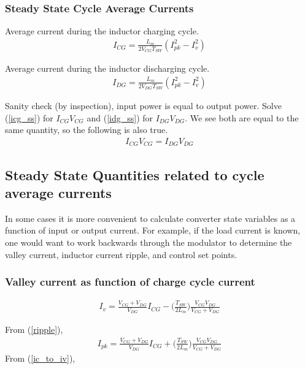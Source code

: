 \documentclass{scrartcl}
\begin{document}
		\subsubsection{Steady State Cycle Average Currents}
			Average current during the inductor charging cycle.
			\begin{align}
			I_{CG} = \frac{L_m}{2V_{CG}T_{SW}} (I_{pk}^2 - I_v^2) \label{icg_ss}
			\end{align}	
			
			Average current during the inductor discharging cycle.
			\begin{align}
			I_{DG} = \frac{L_m}{2V_{DG}T_{SW}} (I_{pk}^2 - I_v^2) \label{idg_ss}
			\end{align}	
			
			Sanity check (by inspection), input power is equal to output power. Solve (\ref{icg_ss}) for $I_{CG}V_{CG}$ and (\ref{idg_ss}) for $I_{DG}V_{DG}$.  We see both are equal to the same quantity, so the following is also true.
			\begin{align}
			I_{CG}V_{CG} = I_{DG}V_{DG}  
			\end{align}	
	
	\subsection{Steady State Quantities related to cycle average currents}	
	In some cases it is more convenient to calculate converter state variables as a function of input or output current.  For example, if the load current is known, one would want to work backwards through the modulator to determine the valley current, inductor current ripple, and control set points.
	
		\subsubsection{Valley current as function of charge cycle current}
			\begin{align}
			I_{v} = \frac{V_{CG} + V_{DG}}{V_{DG}} I_{CG} - \bigg(\frac{T_{SW}}{2L_m}\bigg)\frac{V_{CG}V_{DG}}{V_{CG} + V_{DG}} 
			\end{align}	
			
			From (\ref{ripple}),
			\begin{align}
			I_{pk} = \frac{V_{CG} + V_{DG}}{V_{DG}} I_{CG} + \bigg(\frac{T_{SW}}{2L_m}\bigg)\frac{V_{CG}V_{DG}}{V_{CG} + V_{DG}} 
			\end{align}	
			From (\ref{ic_to_iv}),
\end{document}

